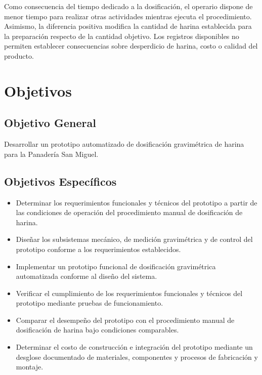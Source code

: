 Como consecuencia del tiempo dedicado a la dosificación, el operario
dispone de menor tiempo para realizar otras actividades mientras ejecuta
el procedimiento. Asimismo, la diferencia positiva modifica la cantidad
de harina establecida para la preparación respecto de la cantidad objetivo.
Los registros disponibles no permiten establecer consecuencias sobre
desperdicio de harina, costo o calidad del producto.


\section{Objetivos}
\label{sec:objetivos}

\subsection{Objetivo General}
\label{subsec:objetivo_general}

Desarrollar un prototipo automatizado de dosificación gravimétrica de
harina para la Panadería San Miguel.

\subsection{Objetivos Específicos}
\label{subsec:objetivos_especificos}

\begin{itemize}

    \item Determinar los requerimientos funcionales y técnicos del
    prototipo a partir de las condiciones de operación del procedimiento
    manual de dosificación de harina.

    \item Diseñar los subsistemas mecánico, de medición gravimétrica y de
    control del prototipo conforme a los requerimientos establecidos.

    \item Implementar un prototipo funcional de dosificación gravimétrica
    automatizada conforme al diseño del sistema.

    \item Verificar el cumplimiento de los requerimientos funcionales y
    técnicos del prototipo mediante pruebas de funcionamiento.

    \item Comparar el desempeño del prototipo con el procedimiento manual de dosificación de harina bajo condiciones comparables.

    \item Determinar el costo de construcción e integración del prototipo
    mediante un desglose documentado de materiales, componentes y procesos
    de fabricación y montaje.

\end{itemize}

